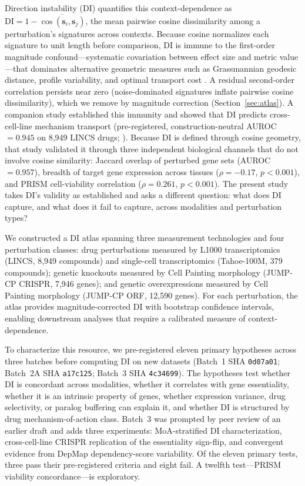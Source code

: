 \documentclass[11pt]{article}
\begin{document}
Direction instability (DI) quantifies this context-dependence as
$\mathrm{DI} = 1 - \overline{\cos(\mathbf{s}_i, \mathbf{s}_j)}$, the
mean pairwise cosine dissimilarity among a perturbation's signatures
across contexts.  Because cosine normalizes each signature to unit
length before comparison, DI is immune to the first-order magnitude
confound---systematic covariation between effect size and metric
value---that dominates alternative geometric measures such as
Grassmannian geodesic distance, profile variability, and optimal
transport cost \citep{tower2026confound}.  A residual second-order
correlation persists near zero (noise-dominated signatures inflate
pairwise cosine dissimilarity), which we remove by magnitude correction
(Section~\ref{sec:atlas}).  A companion study established this immunity and showed that DI predicts
cross-cell-line mechanism transport (pre-registered,
construction-neutral AUROC $= 0.945$ on 8{,}949 LINCS drugs;
\citealp{tower2026confound}).  Because DI is defined through cosine
geometry, that study validated it through three independent biological
channels that do not involve cosine similarity: Jaccard overlap of
perturbed gene sets (AUROC $= 0.957$), breadth of target gene expression
across tissues ($\rho = -0.17$, $p < 0.001$), and PRISM cell-viability
correlation ($\rho = 0.261$, $p < 0.001$).  The present study takes
DI's validity as established and asks a different question: what does DI
capture, and what does it fail to capture, across modalities and
perturbation types?

We constructed a DI atlas spanning three measurement technologies and
four perturbation classes: drug perturbations measured by L1000
transcriptomics (LINCS, 8{,}949 compounds) and single-cell
transcriptomics (Tahoe-100M, 379 compounds); genetic knockouts measured
by Cell Painting morphology (JUMP-CP CRISPR, 7{,}946 genes); and
genetic overexpressions measured by Cell Painting morphology (JUMP-CP
ORF, 12{,}590 genes).  For each perturbation, the atlas provides
magnitude-corrected DI with bootstrap confidence intervals, enabling
downstream analyses that require a calibrated measure of
context-dependence.

To characterize this resource, we pre-registered eleven primary
hypotheses across three batches before computing DI on new datasets
(Batch~1 SHA \texttt{0d07a01}; Batch~2A SHA \texttt{a17c125};
Batch~3 SHA \texttt{4c34699}).  The
hypotheses test whether DI is concordant across modalities,
whether it correlates with gene essentiality, whether it is an
intrinsic property of genes, whether expression variance,
drug selectivity, or paralog buffering can explain it, and whether
DI is structured by drug mechanism-of-action class.
Batch~3 was prompted by peer review of an earlier draft and adds three
experiments: MoA-stratified DI characterization, cross-cell-line CRISPR
replication of the essentiality sign-flip, and convergent evidence from
DepMap dependency-score variability.
Of the eleven primary tests, three pass their pre-registered criteria
and eight fail.  A twelfth test---PRISM viability concordance---is
exploratory.
\end{document}
